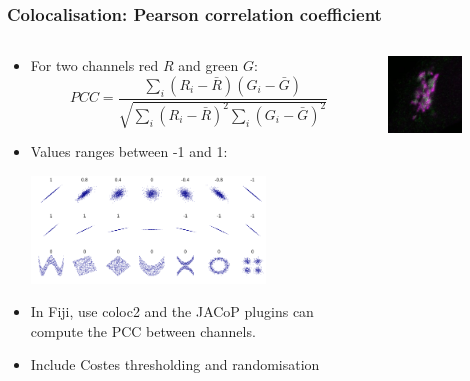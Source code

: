 \documentclass[ignorenonframetext,aspectratio=169,10pt,xcolor=table]{beamer}
\begin{document}
\begin{frame} \frametitle{Colocalisation: Pearson correlation coefficient}
  \begin{columns}
    \begin{column}{0.6\textwidth}
      \begin{itemize}
      \item For two channels red $R$ and green $G$:
      \begin{equation*}
        PCC = 
        \frac{\sum_i (R_i - \bar{R}) (G_i - \bar{G})}
             {\sqrt{\sum_i (R_i - \bar{R})^2 \sum_i (G_i - \bar{G})^2}}
      \end{equation*}
      \item Values ranges between -1 and 1:
      \begin{center}
      \includegraphics[width=0.7\textwidth]{pcc.png}
      \end{center}
      \item In Fiji, use coloc2 and the JACoP plugins can compute the PCC between channels.
      \item Include Costes thresholding and randomisation
      \end{itemize}
    \end{column}
    \begin{column}{0.4\textwidth}
      \centering
      \includegraphics[width=0.6\textwidth]{colocalization.jpg}

\end{column}
\end{columns}
\end{frame}
\end{document}
